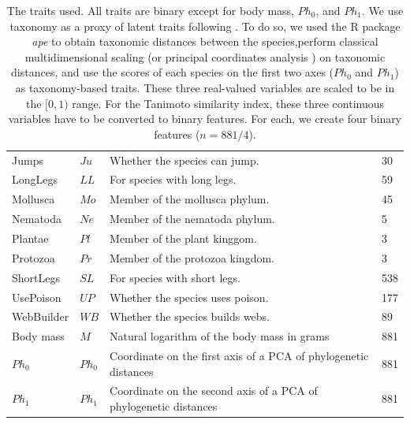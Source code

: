 \documentclass[letterpaper]{article}
\begin{document}
\begin{table}
\begin{tabular}{|llll|}
    Jumps             & $Ju$   & Whether the species can jump.                                    & 30 \\
    LongLegs          & $LL$   & For species with long legs.                                      & 59 \\
    Mollusca          & $Mo$   & Member of the mollusca phylum.                                   & 45 \\
    Nematoda          & $Ne$   & Member of the nematoda phylum.                                   & 5 \\
    Plantae           & $Pl$   & Member of the plant kinggom.                                     & 3 \\
    Protozoa          & $Pr$   & Member of the protozoa kingdom.                                  & 3 \\
    ShortLegs         & $SL$   & For species with short legs.                                     & 538 \\
    UsePoison         & $UP$   & Whether the species uses poison.                                 & 177 \\
    WebBuilder        & $WB$   & Whether the species builds webs.                                 & 89 \\
    Body mass         & $M$    & Natural logarithm of the body mass in grams                      & 881 \\
    $Ph_0$            & $Ph_0$ & Coordinate on the first axis of a PCA of phylogenetic distances  & 881 \\
    $Ph_1$            & $Ph_1$ & Coordinate on the second axis of a PCA of phylogenetic distances & 881 \\
    \hline
  \end{tabular}

  \caption{The traits used. All traits are binary except for body mass, $Ph_0$,
  and $Ph_1$. We use taxonomy as a proxy of latent traits following
  \cite{mou12}. To do so, we used the R package \emph{ape} to obtain taxonomic
  distances between the species,perform classical multidimensional scaling (or
  principal coordinates analysis \cite{cox01}) on taxonomic distances, and use
  the scores of each species on the first two axes ($Ph_0$ and $Ph_1$) as
  taxonomy-based traits. These three real-valued variables are scaled to be in
  the $[0, 1)$ range. For the Tanimoto similarity index, these three continuous
  variables have to be converted to binary features. For each, we create four
  binary features ($n = 881/4$).}

  \label{table:features}
\end{table}
\end{document}
